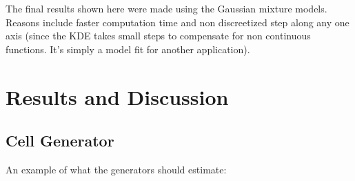 \documentclass[12pt, a4paper]{article}
\begin{document}
\begin{multicols}{2}
                The final results shown here were made using the Gaussian mixture models. Reasons include faster computation time and non discreetized step along any one axis (since the KDE takes small steps to compensate for non continuous functions. It's simply a model fit for another application).
                \newline



        \section{Results and Discussion} \label{sec:Res}

            \subsection{Cell Generator}\label{sub:Cell Generator} %

                An example of what the generators should estimate:

                \end{multicols}
\end{document}
